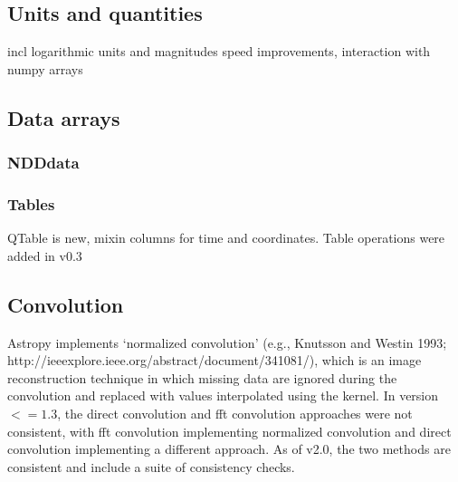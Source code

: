 \documentclass[modern]{aastex61}
\begin{document}
\subsection{Units and quantities}

incl logarithmic units and magnitudes
speed improvements,
interaction with numpy arrays

\subsection{Data arrays}

\subsubsection{NDDdata}

\subsubsection{Tables}
QTable is new, mixin columns for time and coordinates. Table operations were added in v0.3

\subsection{Convolution}
Astropy implements `normalized convolution' (e.g., Knutsson and Westin 1993; http://ieeexplore.ieee.org/abstract/document/341081/), which is an image reconstruction technique in which missing data are ignored during the convolution and replaced with values interpolated using the kernel.   In version $<=1.3$, the direct convolution and fft convolution approaches were not consistent, with fft convolution implementing normalized convolution and direct convolution implementing a different approach.  As of v2.0, the two methods are consistent and include a suite of consistency checks.
\end{document}
